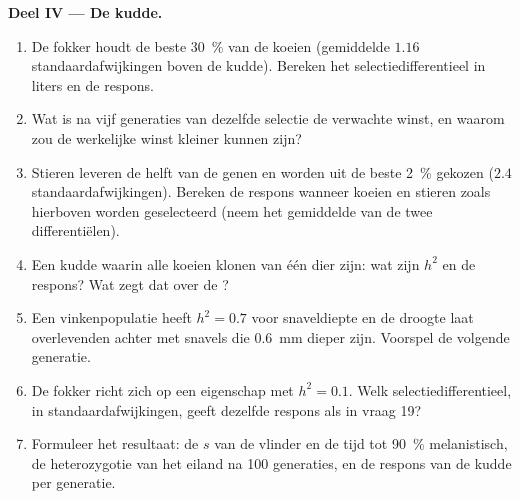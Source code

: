 \begin{problem}
\medskip
\noindent\textbf{Deel IV --- De kudde.}
\begin{enumerate}[resume]
  \item De fokker houdt de beste \qty{30}{\%} van de koeien (gemiddelde $1.16$
        standaardafwijkingen boven de kudde). Bereken het
        selectiedifferentieel in liters en de respons.
  \item Wat is na vijf generaties van dezelfde selectie de verwachte winst,
        en waarom zou de werkelijke winst kleiner kunnen zijn?
  \item Stieren leveren de helft van de genen en worden uit de beste
        \qty{2}{\%} gekozen ($2.4$ standaardafwijkingen). Bereken de respons
        wanneer koeien en stieren zoals hierboven worden geselecteerd (neem het
        gemiddelde van de twee differentiëlen).
  \item Een kudde waarin alle koeien klonen van één dier zijn: wat zijn
        $h^{2}$ en de respons? Wat zegt dat over de
        ?
  \item Een vinkenpopulatie heeft $h^{2} = 0.7$ voor snaveldiepte en de
        droogte laat overlevenden achter met snavels die \qty{0.6}{mm} dieper
        zijn. Voorspel de volgende generatie.
  \item De fokker richt zich op een eigenschap met $h^{2} = 0.1$. Welk
        selectiedifferentieel, in standaardafwijkingen, geeft dezelfde
        respons als in vraag 19?
  \item Formuleer het resultaat: de $s$ van de vlinder en de tijd tot \qty{90}{\%}
        melanistisch, de heterozygotie van het eiland na 100 generaties,
        en de respons van de kudde per generatie.
\end{enumerate}
\end{problem}
